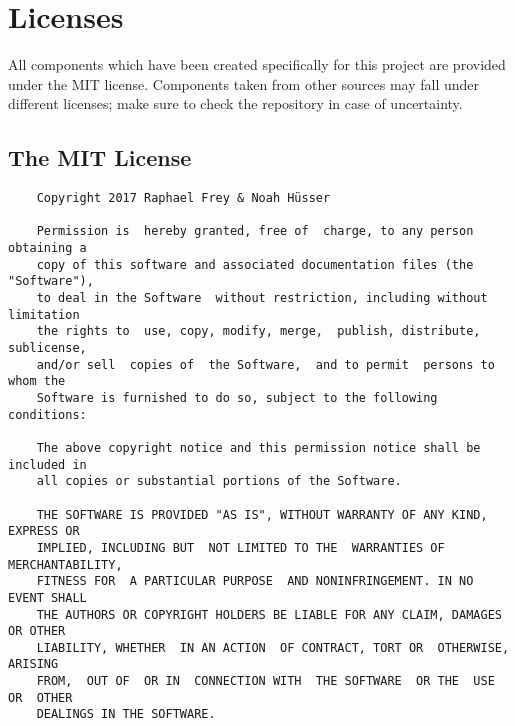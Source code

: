 %
%
\chapter{Licenses} %
\label{ch:app:licenses}

All  components which  have been  created  specifically for  this project  are
provided under the  MIT license. Components taken from other  sources may fall
under  different licenses;  make  sure  to check  the  repository  in case  of
uncertainty.

\section[The MIT License]{The MIT License~\cite{licenses:mit}} %
\label{sec:mit_license}

\begin{tcolorbox}
    \begin{verbatim}
    Copyright 2017 Raphael Frey & Noah Hüsser

    Permission is  hereby granted, free of  charge, to any person  obtaining a
    copy of this software and associated documentation files (the "Software"),
    to deal in the Software  without restriction, including without limitation
    the rights to  use, copy, modify, merge,  publish, distribute, sublicense,
    and/or sell  copies of  the Software,  and to permit  persons to  whom the
    Software is furnished to do so, subject to the following conditions:

    The above copyright notice and this permission notice shall be included in
    all copies or substantial portions of the Software.

    THE SOFTWARE IS PROVIDED "AS IS", WITHOUT WARRANTY OF ANY KIND, EXPRESS OR
    IMPLIED, INCLUDING BUT  NOT LIMITED TO THE  WARRANTIES OF MERCHANTABILITY,
    FITNESS FOR  A PARTICULAR PURPOSE  AND NONINFRINGEMENT. IN NO  EVENT SHALL
    THE AUTHORS OR COPYRIGHT HOLDERS BE LIABLE FOR ANY CLAIM, DAMAGES OR OTHER
    LIABILITY, WHETHER  IN AN ACTION  OF CONTRACT, TORT OR  OTHERWISE, ARISING
    FROM,  OUT OF  OR IN  CONNECTION WITH  THE SOFTWARE  OR THE  USE OR  OTHER
    DEALINGS IN THE SOFTWARE.
    \end{verbatim}
\end{tcolorbox}
